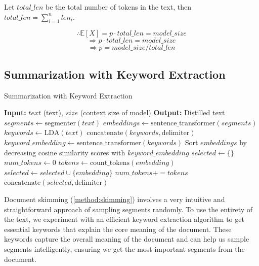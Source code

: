 Let $total\_len$ be the total number of tokens in the text, then $total\_len = \sum_{i = 1}^{n} len_i$.

\[ \therefore \mathbb{E}[X] = p \cdot total\_len = model\_size \]
\[ \Rightarrow p \cdot total\_len = model\_size \]
\[ \Rightarrow p = model\_size / total\_len \]


\subsection{Summarization with Keyword Extraction}
\label{method:keyword}

\begin{algorithm*}
  \caption{Summarization with Keyword Extraction}

  \begin{algorithmic}
    \State \textbf{Input:} $text$ (text), $size$ (context size of model)
    \State \textbf{Output:} Distilled text
    \State $segments \leftarrow \text{segmenter}(text)$
    \State $embeddings \leftarrow \text{sentence\_transformer}(segments)$
    \State $keywords \leftarrow \text{LDA}(text)$
    \State $\text{concatenate}(keywords, \text{delimiter})$
    \State $keyword\_embedding \leftarrow \text{sentence\_transformer}(keywords)$
    \State Sort $embeddings$ by decreasing cosine similarity scores with $keyword\_embedding$
    \State $selected \leftarrow \{\}$
    \State $num\_tokens \leftarrow 0$
      \State $tokens \leftarrow \text{count\_tokens}(embedding)$
        \State $selected \leftarrow selected \cup \{embedding\}$
        \State $num\_tokens += tokens$
      \EndIf
    \EndFor
    \State $\text{concatenate}(selected, \text{delimiter})$
    \State {}
  \end{algorithmic}

  \label{algo:keyword}
\end{algorithm*}

Document skimming (\autoref{method:skimming}) involves a very intuitive and straightforward approach of sampling segments randomly.
To use the entirety of the text, we experiment with an efficient keyword extraction algorithm to get essential keywords that explain the core meaning of the document.
These keywords capture the overall meaning of the document and can help us sample segments intelligently, ensuring we get the most important segments from the document.

